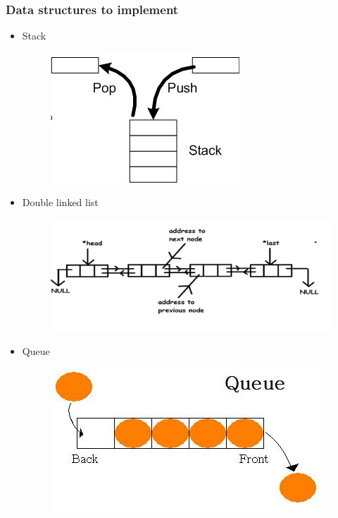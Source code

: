\documentclass{beamer}
\begin{document}
\begin{frame}
\frametitle{Data structures to implement}

\begin{itemize}
\item Stack
\begin{figure}
\centering
        \includegraphics[totalheight=1.5cm]{Stack.jpg}
    \label{fig:verticalcell}
    \end{figure}
\item Double linked list
\begin{figure}
\centering
        \includegraphics[totalheight=2cm]{list.png}
    \label{fig:verticalcell}
    \end{figure}
    
\item Queue

\begin{figure}
\centering
        \includegraphics[totalheight=1.5cm]{queue.jpg}
    \label{fig:verticalcell}
    \end{figure}
\end{itemize}

\end{frame}
\end{document}
